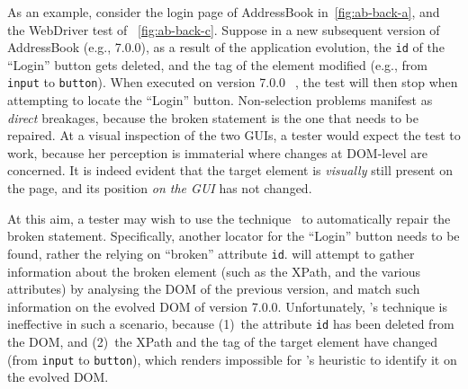 As an example, consider the login page of AddressBook in~\autoref{fig:ab-back-a}, and the WebDriver test of ~\autoref{fig:ab-back-c}. %
%
Suppose in a new subsequent version of AddressBook (e.g., 7.0.0), as a result of the application evolution, the \texttt{id} of the ``Login'' button gets deleted, and the tag of the element modified (e.g., from \texttt{input} to \texttt{button}). 
When executed on version 7.0.0~\textcircled{}, the test will then stop when attempting to locate the ``Login'' button. Non-selection problems manifest as \textit{direct} breakages, because the broken statement is the one that needs to be repaired.  
%
At a visual inspection of the two GUIs, a tester would expect the test to work, because her perception is immaterial where changes at DOM-level are concerned. It is indeed evident that the target element is \textit{visually} still present on the page, and its position \textit{on the GUI} has not changed.
 
At this aim, a tester may wish to use the \water  technique~\cite{Choudhary:2011:WWA:2002931.2002935} to automatically repair the broken statement. Specifically, another locator for the ``Login'' button needs to be found, rather the relying on ``broken'' attribute \texttt{id}. \water will attempt to gather information about the broken element (such as the XPath, and the various attributes) by analysing the DOM of the previous version, and match such information on the evolved DOM of version 7.0.0. Unfortunately, \water's technique is ineffective in such a scenario, because (1)~the attribute \texttt{id} has been deleted from the DOM, and (2)~the XPath and the tag of the target element have changed (from \mbox{\texttt{input}} to \mbox{\texttt{button}}), which renders impossible for \water's heuristic to identify it on the evolved DOM. %
 
